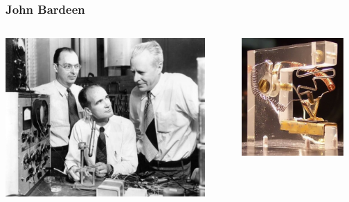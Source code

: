 \documentclass[14pt]{beamer}
\begin{document}
\begin{frame}
	\frametitle{John Bardeen}
	\begin{center}
		\begin{columns}
			\begin{column}{0.5\textwidth}
		\includegraphics[width=0.9\textwidth]{john_bardeen.jpg}
			\end{column}
			\begin{column}{0.5\textwidth}
		\includegraphics[width=0.9\textwidth]{john_bardeen_transistor.jpg}
			\end{column}
		\end{columns}
		
		\vspace*{1em}
	\end{center}
\end{frame}
\end{document}
